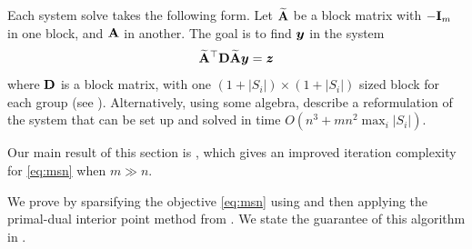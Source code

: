 \documentclass[11pt]{article}
\numberwithin{equation}{section}
\begin{document}

Each system solve takes the following form. Let \(\widetilde{\mathbf{A}}\) be a block matrix with \(- \mathbf{I}_m\) in one block, and \(\mathbf{A}\) in another.
The goal is to find \(\bm{y}\) in the system
\[\widetilde{\mathbf{A}}^\top \mathbf{D} \widetilde{\mathbf{A}} \bm{y} = \bm{z}\]
where \(\mathbf{D}\) is a block matrix, with one \((1 + |S_i|) \times (1 + |S_i|)\) sized block for each group
(see \cite[equation (4.13)]{xy97}).
Alternatively, using some algebra, \cite{xy97}
describe a reformulation of the system that can be set up and solved in time \(O(n^3 + m n^2 \max_i |S_i|)\).

Our main result of this section is , which gives an improved iteration complexity for \eqref{eq:msn} when $m \gg n$.

\msnalg*



We prove  by sparsifying the objective \eqref{eq:msn} using  and then applying the primal-dual interior point method from \cite{xy97}. We state the guarantee of this algorithm in .
\end{document}
